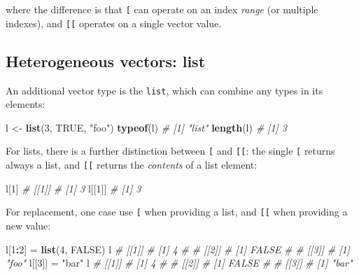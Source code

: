 \documentclass[]{book}
\newenvironment{Shaded}{\begin{snugshade}}{\end{snugshade}}
\newcommand{\CommentTok}[1]{\textcolor[rgb]{0.56,0.35,0.01}{\textit{#1}}}
\newcommand{\DecValTok}[1]{\textcolor[rgb]{0.00,0.00,0.81}{#1}}
\newcommand{\KeywordTok}[1]{\textcolor[rgb]{0.13,0.29,0.53}{\textbf{#1}}}
\newcommand{\NormalTok}[1]{#1}
\newcommand{\OperatorTok}[1]{\textcolor[rgb]{0.81,0.36,0.00}{\textbf{#1}}}
\newcommand{\OtherTok}[1]{\textcolor[rgb]{0.56,0.35,0.01}{#1}}
\newcommand{\StringTok}[1]{\textcolor[rgb]{0.31,0.60,0.02}{#1}}
\begin{document}
where the difference is that \texttt{{[}} can operate on an index \emph{range}
(or multiple indexes), and \texttt{{[}{[}} operates on a single vector value.

\hypertarget{heterogeneous-vectors-list}{%
\subsection*{Heterogeneous vectors: list}\label{heterogeneous-vectors-list}}

An additional vector type is the \texttt{list}, which can combine any types in
its elements:

\begin{Shaded}
\begin{Highlighting}[]
\NormalTok{l <-}\StringTok{ }\KeywordTok{list}\NormalTok{(}\DecValTok{3}\NormalTok{, }\OtherTok{TRUE}\NormalTok{, }\StringTok{"foo"}\NormalTok{)}
\KeywordTok{typeof}\NormalTok{(l)}
\CommentTok{# [1] "list"}
\KeywordTok{length}\NormalTok{(l)}
\CommentTok{# [1] 3}
\end{Highlighting}
\end{Shaded}

For lists, there is a further distinction between \texttt{{[}} and \texttt{{[}{[}}: the single
\texttt{{[}} returns always a list, and \texttt{{[}{[}} returns the \emph{contents} of a list element:

\begin{Shaded}
\begin{Highlighting}[]
\NormalTok{l[}\DecValTok{1}\NormalTok{]}
\CommentTok{# [[1]]}
\CommentTok{# [1] 3}
\NormalTok{l[[}\DecValTok{1}\NormalTok{]]}
\CommentTok{# [1] 3}
\end{Highlighting}
\end{Shaded}

For replacement, one case use \texttt{{[}} when providing a list, and \texttt{{[}{[}} when providing
a new value:

\begin{Shaded}
\begin{Highlighting}[]
\NormalTok{l[}\DecValTok{1}\OperatorTok{:}\DecValTok{2}\NormalTok{] =}\StringTok{ }\KeywordTok{list}\NormalTok{(}\DecValTok{4}\NormalTok{, }\OtherTok{FALSE}\NormalTok{)}
\NormalTok{l}
\CommentTok{# [[1]]}
\CommentTok{# [1] 4}
\CommentTok{# }
\CommentTok{# [[2]]}
\CommentTok{# [1] FALSE}
\CommentTok{# }
\CommentTok{# [[3]]}
\CommentTok{# [1] "foo"}
\NormalTok{l[[}\DecValTok{3}\NormalTok{]] =}\StringTok{ "bar"}
\NormalTok{l}
\CommentTok{# [[1]]}
\CommentTok{# [1] 4}
\CommentTok{# }
\CommentTok{# [[2]]}
\CommentTok{# [1] FALSE}
\CommentTok{# }
\CommentTok{# [[3]]}
\CommentTok{# [1] "bar"}
\end{Highlighting}
\end{Shaded}
\end{document}
